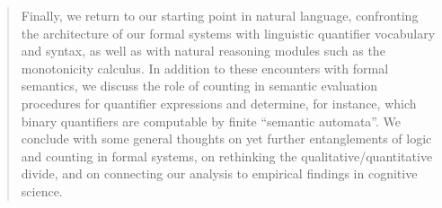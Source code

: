 \documentclass[12pt,oneside,reqno]{amsart}
\theoremstyle{definition}
\begin{document}
\begin{abstract}
Finally, we return to our starting point in natural language, confronting the architecture of our formal systems with linguistic quantifier vocabulary and syntax, as well as with natural reasoning modules such as the monotonicity calculus. In addition to these encounters with  formal semantics, we discuss the role of counting in semantic evaluation procedures for quantifier expressions and determine, for instance, which binary quantifiers are computable by finite ``semantic automata''. We conclude with some general thoughts on yet further entanglements of logic and counting in formal systems, on rethinking the qualitative/quantitative divide, and on connecting our analysis to empirical findings in  cognitive science.
\end{abstract} %

\newpage

\tableofcontents
\end{document}
